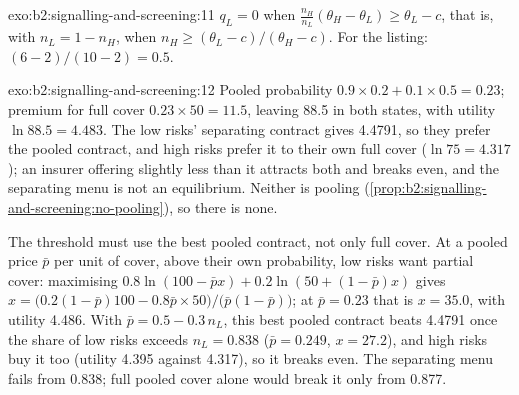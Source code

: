 \begin{solution}{exo:b2:signalling-and-screening:11}
$q_L = 0$ when $\frac{n_H}{n_L}(\theta_H - \theta_L) \ge \theta_L - c$, that is, with $n_L = 1 - n_H$, when $n_H \ge (\theta_L - c)/(\theta_H - c)$. For the listing:
$(6 - 2)/(10 - 2) = 0.5$.
\end{solution}

\begin{solution}{exo:b2:signalling-and-screening:12}
Pooled probability $0.9 \times 0.2 + 0.1 \times 0.5 = 0.23$; premium for full cover $0.23 \times 50 = 11.5$, leaving 88.5 in both states, with
utility $\ln 88.5 = 4.483$. The low risks' separating contract gives 4.4791, so they prefer the pooled contract, and high risks
prefer it to their own full cover ($\ln 75 = 4.317$); an insurer offering slightly less than it attracts both and breaks even,
and the separating menu is not an equilibrium. Neither is pooling (\cref{prop:b2:signalling-and-screening:no-pooling}), so there is
none.

The threshold must use the best pooled contract, not only full cover. At a pooled price $\bar p$ per unit of cover, above
their own probability, low risks want partial cover: maximising $0.8\ln(100 - \bar p x) + 0.2\ln(50 + (1 - \bar p)x)$ gives
$x = \bigl(0.2(1 - \bar p)100 - 0.8\bar p \times 50\bigr)/\bigl(\bar p(1 - \bar p)\bigr)$; at $\bar p = 0.23$ that is $x = 35.0$, with utility
4.486. With $\bar p = 0.5 - 0.3\,n_L$, this best pooled contract beats 4.4791 once the share of low risks exceeds $n_L = 0.838$
($\bar p = 0.249$, $x = 27.2$), and high risks buy it too (utility 4.395 against 4.317), so it breaks even. The separating menu
fails from 0.838; full pooled cover alone would break it only from 0.877.
\end{solution}

